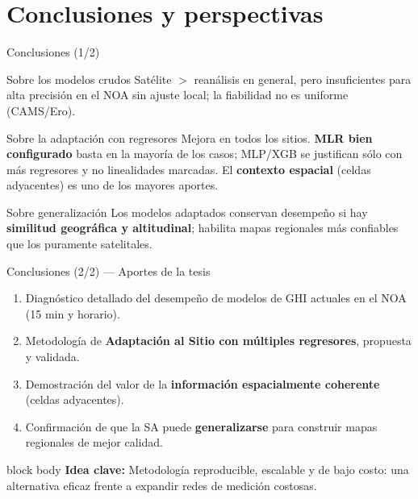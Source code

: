 \documentclass[aspectratio=169,11pt]{beamer}
\newcommand{\clave}[1]{%
  \begin{beamercolorbox}[wd=\linewidth,sep=6pt,rounded=true]{block body}%
    \footnotesize\textbf{\color{primary}Idea clave: }#1%
  \end{beamercolorbox}}
\begin{document}
\section{Conclusiones y perspectivas}

\begin{frame}{Conclusiones (1/2)}
  \footnotesize
  \begin{block}{Sobre los modelos crudos}
    \scriptsize Satélite $>$ reanálisis en general, pero insuficientes para alta precisión en el NOA sin ajuste local; la fiabilidad no es uniforme (CAMS/Ero).
  \end{block}
  \begin{block}{Sobre la adaptación con regresores}
    \scriptsize Mejora en todos los sitios. \textbf{MLR bien configurado} basta en la mayoría de los casos; MLP/XGB se justifican sólo con más regresores y no linealidades marcadas. El \textbf{contexto espacial} (celdas adyacentes) es uno de los mayores aportes.
  \end{block}
  \begin{block}{Sobre generalización}
    \scriptsize Los modelos adaptados conservan desempeño si hay \textbf{similitud geográfica y altitudinal}; habilita mapas regionales más confiables que los puramente satelitales.
  \end{block}
\end{frame}

\begin{frame}{Conclusiones (2/2) — Aportes de la tesis}
  \footnotesize
  \begin{enumerate}
    \item Diagnóstico detallado del desempeño de modelos de GHI actuales en el NOA (15 min y horario).
    \item Metodología de \textbf{Adaptación al Sitio con múltiples regresores}, propuesta y validada.
    \item Demostración del valor de la \textbf{información espacialmente coherente} (celdas adyacentes).
    \item Confirmación de que la SA puede \textbf{generalizarse} para construir mapas regionales de mejor calidad.
  \end{enumerate}
  \vspace{0.4em}
  \clave{Metodología reproducible, escalable y de bajo costo: una alternativa eficaz frente a expandir redes de medición costosas.}
\end{frame}
\end{document}
